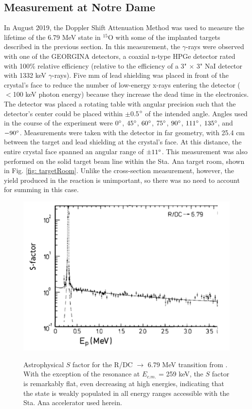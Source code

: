 \subsection{Measurement at Notre Dame}
\label{sec: lifetimeND}

In August 2019, the Doppler Shift Attenuation Method was used to measure the lifetime of the 6.79 MeV state in $^{15}$O with some of the implanted targets described in the previous section. In this measurement, the $\gamma$-rays were observed with one of the GEORGINA detectors, a coaxial n-type HPGe detector rated with 100\% relative efficiency (relative to the efficiency of a 3" $\times$ 3" NaI detector with 1332 keV $\gamma$-rays). Five mm of lead shielding was placed in front of the crystal's face to reduce the number of low-energy x-rays entering the detector ($<$100 keV photon energy) because they increase the dead time in the electronics. The detector was placed a rotating table with angular precision such that the detector's center could be placed within $\pm$0.5$\degree$ of the intended angle. Angles used in the course of the experiment were $0\degree$, $45\degree$, $60\degree$, $75\degree$, $90\degree$, $111\degree$, $135\degree$, and $-90\degree$. Measurements were taken with the detector in far geometry, with 25.4 cm between the target and lead shielding at the crystal's face. At this distance, the entire crystal face spanned an angular range of $\pm11\degree$. This measurement was also performed on the solid target beam line within the Sta. Ana target room, shown in Fig. \ref{fig: targetRoom}. Unlike the cross-section measurement, however, the yield produced in the reaction is unimportant, so there was no need to account for summing in this case. 

\begin{figure}
\centering
\includegraphics[width=0.7\linewidth]{figures/schroderSfac.png}
\label{fig: schroderSfac}
\caption{Astrophysical $S$ factor for the R/DC $\rightarrow$ 6.79 MeV transition from \cite{Schroder1987}. With the exception of the resonance at $E_{c.m.}$ = 259 keV, the $S$ factor is remarkably flat, even decreasing at high energies, indicating that the state is weakly populated in all energy ranges accessible with the Sta. Ana accelerator used herein. }
\end{figure}


